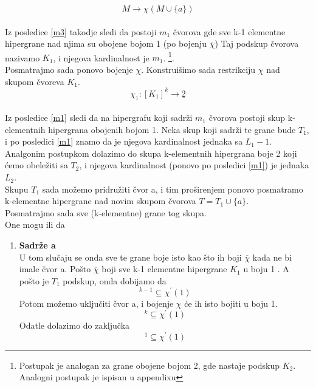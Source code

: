 \documentclass[a4paper]{article}
\begin{document}
\begin{description}
		\begin{equation}
			M \rightarrow \chi (M \cup \{a\})
		\end{equation}
		\\
		Iz posledice \ref{m3} takodje sledi da postoji $m_1$ čvorova gde sve k-1 elementne hipergrane nad njima su obojene bojom 1 (po bojenju $\overline{\chi}$)
		Taj podskup čvorova nazivamo $K_1$, i njegova kardinalnost je  $m_1$. \footnote{Postupak je analogan za grane obojene bojom 2, gde nastaje podskup $K_2$. Analogni postupak je ispisan u appendixu}. \\
		Posmatrajmo sada ponovo bojenje $\chi$. Konstruišimo sada restrikciju $\chi$ nad  skupom čvoreva $K_1$.
		\begin{equation}
			\chi_1 : [ K_1 ]^k  \rightarrow \underline{2}
		\end{equation}\\
		Iz posledice \ref{m1} sledi da na hipergrafu koji sadrži $m_1$ čvorova postoji skup k-elementnih hipergrana obojenih bojom 1. Neka skup koji sadrži te grane bude $T_1$, i po posledici \ref{m1} znamo da je njegova kardinalnost jednaka sa $L_1 - 1$. Analgonim postupkom dolazimo do  skupa k-elementnih hipergrana boje 2 koji ćemo obeležiti sa $T_2$, i njegova kardinalnost (ponovo po posledici \ref{m1}) je jednaka $L_2$. \\
		Skupu $T_1$ sada možemo pridružiti čvor a, i tim proširenjem ponovo posmatramo k-elementne hipergrane nad novim skupom čvorova $T = T_1 \cup \{a\}$.\\
		Posmatrajmo sada sve (k-elementne) grane tog skupa.\\
		One mogu ili da 
		\begin{enumerate}
			\item \textbf{Sadrže a}\\
				U tom slučaju se onda sve te grane boje isto kao što ih boji $\overline{\chi}$ kada ne bi imale čvor a. Pošto $\overline{\chi}$ boji sve k-1 elementne hipergrane $K_1$ u boju 1 . A pošto je $T_1$ podskup, onda dobijamo da 
				\begin{equation}
					[ T_1 ]^{k-1} \subseteq \chi^\prime (1)
				\end{equation}
				Potom možemo uključiti čvor a, i bojenje $\chi$ će ih isto bojiti u boju 1.
				\begin{equation}
					[ T_1 \cup \{a\} ]^{k} \subseteq \chi^\prime (1)
				\end{equation}
				Odatle dolazimo do zaključka 
				\begin{equation}
					[ T ]^{1} \subseteq \chi^\prime (1)

\end{equation}
\end{enumerate}
\end{description}
\end{document}
